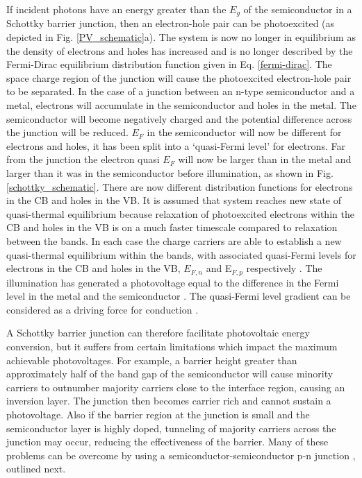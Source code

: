 \documentclass[11pt, twoside]{report}
\begin{document}
If incident photons have an energy greater than the $E_g$ of the semiconductor in a Schottky barrier junction, then an electron-hole pair can be photoexcited (as depicted in Fig. \ref{PV_schematic}a). The system is now no longer in equilibrium as the density of electrons and holes has increased and is no longer described by the Fermi-Dirac equilibrium distribution function given in Eq. \ref{fermi-dirac}. 
The space charge region of the junction will cause the photoexcited electron-hole pair to be separated. In the case of a junction between an n-type semiconductor and a metal, electrons will accumulate in the semiconductor and holes in the metal. The semiconductor will become negatively charged and the potential difference across the junction will be reduced. $E_F$ in the semiconductor will now be different for electrons and holes, it has been split into a `quasi-Fermi level' for electrons. Far from the junction the electron quasi $E_F$ will now be larger than in the metal and larger than it was in the semiconductor before illumination, as shown in Fig. \ref{schottky_schematic}.
There are now different distribution functions for electrons in the CB and holes in the VB. It is assumed that system reaches new state of quasi-thermal equilibrium because relaxation of photoexcited electrons within the CB and holes in the VB is on a much faster timescale compared to relaxation between the bands. In each case the charge carriers are able to establish a new quasi-thermal equilibrium within the bands, with associated quasi-Fermi levels for electrons in the CB and holes in the VB, $E_{F,n}$ and E$_{F,p}$ respectively
\cite{Nelson3}.
 The illumination has generated a photovoltage equal to the difference in the Fermi level in the metal and the semiconductor \cite{Nelson5}. The quasi-Fermi level gradient can be considered as a driving force for conduction \cite{Nelson3}.

A Schottky barrier junction can therefore facilitate photovoltaic energy conversion, but it suffers from certain limitations which impact the maximum achievable photovoltages. For example, a barrier height greater than approximately half of the band gap of the semiconductor will cause minority carriers to outnumber majority carriers close to the interface region, causing an inversion layer. The junction then becomes carrier rich and cannot sustain a photovoltage. Also if the barrier region at the junction is small and the semiconductor layer is highly doped, tunneling of majority carriers across the junction may occur, reducing the effectiveness of the barrier. Many of these problems can be overcome by using a semiconductor-semiconductor p-n junction \cite{Nelson5}, outlined next.
\end{document}
